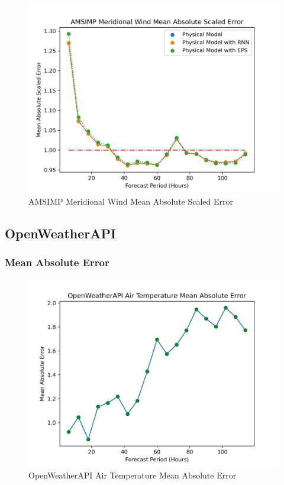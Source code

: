 \begin{appendices}
    \begin{figure}[H]
        \centering
        \includegraphics[width=.7\linewidth]{Graphs/accuracy/appendices/amsimp/meridional_wind/mean_absolute_scaled_error.png}
        \caption{AMSIMP Meridional Wind Mean Absolute Scaled Error}
    \end{figure}
    
    \subsection{OpenWeatherAPI}
    \subsubsection{Mean Absolute Error}
    \begin{figure}[H]
        \centering
        \includegraphics[width=.7\linewidth]{Graphs/accuracy/appendices/openweatherapi/air_temperature/mean_absolute_error.png}
        \caption{OpenWeatherAPI Air Temperature Mean Absolute Error}
    \end{figure}
    

\end{appendices}
